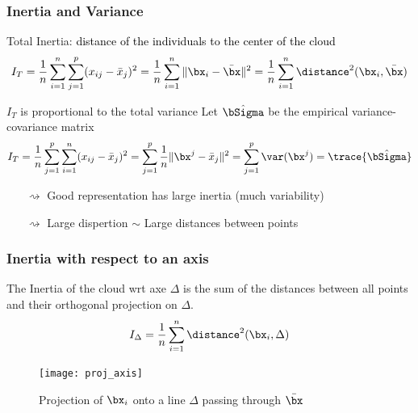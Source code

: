 \documentclass{beamer}\usepackage[]{graphicx}\usepackage[]{color}
\begin{document}
\begin{frame}
  \frametitle{Inertia and Variance}

\begin{block}{Total Inertia: \textcolor{black}{distance of the individuals to the center of the cloud}}
  \[
      I_T = \frac{1}{n}\sum_{i=1}^n \sum_{j=1}^p  (x_{ij}- \bar{x}_{j}) ^2 
      = \frac{1}{n}\sum_{i=1}^n \|\bx_i - \bar{\bx} \|^2  
      = \frac{1}{n}\sum_{i=1}^n \distance^2 (\bx_i,\bar{\bx})
    \]
\end{block}

  \begin{block}{$I_T$ is proportional to the total variance}
  Let $\hat{\bSigma}$ be the empirical variance-covariance matrix
\[
      I_T = \frac{1}{n}\sum_{j=1}^p  \sum_{i=1}^n (x_{ij}- \bar{x}_{j}) ^2 
      = \sum_{j=1}^p \frac{1}{n}\|\bx^j - \bar{x}_{j} \|^2
      = \sum_{j=1}^p \var(\bx^j) = \trace{\hat{\bSigma}}
\]
\end{block}

\begin{itemize}
  \item[$\rightsquigarrow$] \alert{Good representation has large inertia} (much variability)
  \item[$\rightsquigarrow$] \alert{Large dispertion $\sim$ Large distances between points}
\end{itemize}
  
\end{frame}

\begin{frame}
  \frametitle{Inertia with respect to an axis}

  The Inertia of the cloud wrt axe $\Delta$ is the sum of the distances between all points and their orthogonal projection on $\Delta$.
  \begin{equation*}
    \begin{aligned}
      I_\Delta = \frac{1}{n}\sum_{i=1}^n \distance^2(\bx_i, \Delta)
      \end{aligned}
  \end{equation*}

  \begin{figure}
    \texttt{[image: proj\_axis]}
    \caption{Projection of $\bx_i$ onto a line $\Delta$ passing through $\bar\bx$}
  \end{figure}

\end{frame}
\end{document}
